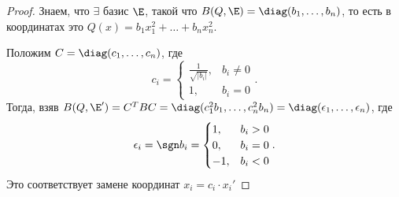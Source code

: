 \begin{proof}
    Знаем, что $\exists$ базис $\E$, такой что $B(Q, \E) = \diag(b_{1}, \dots, b_{n})$, то есть в координатах это $Q(x) = b_{1} x_{1}^{2} + \dots + b_{n} x_{n}^{2}$.

    Положим $C = \diag(c_{1}, \dots, c_{n})$, где
    \begin{equation*}
        c_i = \begin{cases}
            \frac{1}{\sqrt{|b_i|}}, &b_i \neq 0 \\
            1, &b_i = 0
        \end{cases}
    .\end{equation*}
    Тогда, взяв $B(Q, \E') = C^{T} B C = \diag(c_{1}^{2} b_{1}, \dots, c_{n}^{2} b_{n}) = \diag(\epsilon_{1}, \dots, \epsilon_{n})$, где
    \begin{equation*}
        \epsilon_i = \sgn b_i = \begin{cases}
            1, &b_i > 0 \\
            0, &b_i = 0 \\
            -1, &b_i < 0
        \end{cases}
    .\end{equation*}
    Это соответствует замене координат $x_i = c_i \cdot x_{i}'$
\end{proof}

\begin{comment}
    Для $F = \CC$ аналогичные рассуждения показывают, что $\exists$ базис, в котором $Q$ имеет вид \eqref{lec20:1}, где $k = \rk Q$.
    \begin{equation}
        \label{lec20:1}
        Q(x_{1}, \dots, x_{n}) = x_{1}^{2}, \dots, x_{k}^{2}
    .\end{equation}
\end{comment}

